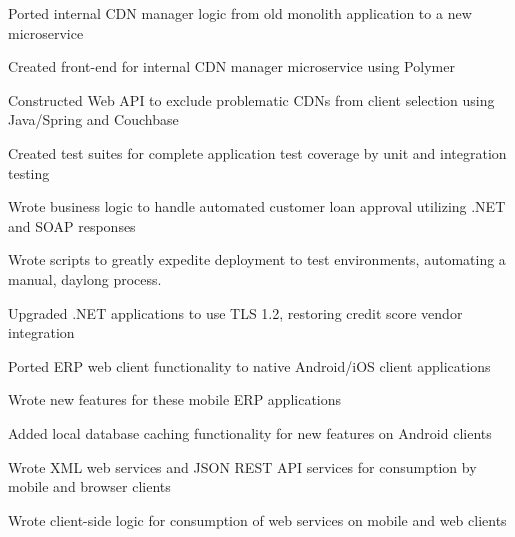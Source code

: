 \documentclass[line]{resume}
\begin{document}
\vspace{3px}

\begin{myitemize}
	\item Ported internal CDN manager logic from old monolith application to a new microservice
	\item Created front-end for internal CDN manager microservice using Polymer
	\item Constructed Web API to exclude problematic CDNs from client selection using Java/Spring and Couchbase
	\item Created test suites for complete application test coverage by unit and integration testing
\end{myitemize}

\vspace{3px}

\begin{myitemize}
	\item Wrote business logic to handle automated customer loan approval utilizing .NET and SOAP responses
	\item Wrote scripts to greatly expedite deployment to test environments, automating a manual, daylong process.
	\item Upgraded .NET applications to use TLS 1.2, restoring credit score vendor integration
\end{myitemize}

\vspace{3px}

\begin{myitemize}
	\item Ported ERP web client functionality to native Android/iOS client applications
	\item Wrote new features for these mobile ERP applications
	\item Added local database caching functionality for new features on Android clients
	\item Wrote XML web services and JSON REST API services for consumption by mobile and browser clients
	\item Wrote client-side logic for consumption of web services on mobile and web clients
\end{myitemize}
\end{document}
